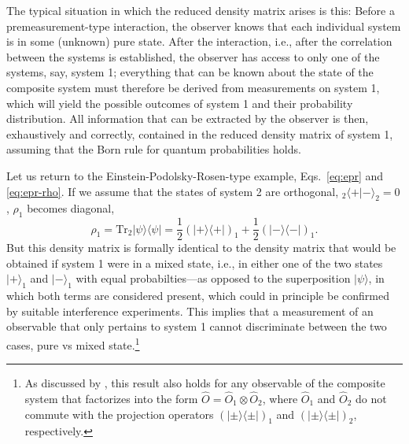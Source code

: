 \documentclass[twocolumn,rmp,aps,amsmath,amsfonts,noshowkeys,noshowpacs]{revtex4}
\newcommand{\ket}[1]{\ensuremath{|{#1\rangle}}}
\newcommand{\bra}[1]{\ensuremath{{\langle #1}|}}
\begin{document}
The typical situation in which the reduced density matrix arises is
this: Before a premeasurement-type interaction, the observer knows
that each individual system is in some (unknown) pure state.  After
the interaction, i.e., after the correlation between the systems is
established, the observer has access to only one of the systems, say,
system 1; everything that can be known about the state of the
composite system must therefore be derived from measurements on system
1, which will yield the possible outcomes of system 1 and their
probability distribution. All information that can be extracted by the
observer is then, exhaustively and correctly, contained in the reduced
density matrix of system 1, assuming that the Born rule for quantum
probabilities holds.

Let us return to the Einstein-Podolsky-Rosen-type example,
Eqs.~\eqref{eq:epr} and \eqref{eq:epr-rho}. If we assume that the
states of system 2 are orthogonal, ${_2\langle +} | - \rangle_2 = 0$,
$\rho_1$ becomes diagonal,
%
\begin{equation}
\rho_1 = \text{Tr}_2 \ket{\psi}\bra{\psi} = \frac{1}{2} (\ket{+}
\bra{+})_1 +  \frac{1}{2}(\ket{-} \bra{-})_1.
\end{equation}
%
But this density matrix is formally identical to the density matrix
that would be obtained if system 1 were in a mixed state, i.e., in
either one of the two states $\ket{+}_1$ and $\ket{-}_1$ with equal
probabilties---as opposed to the superposition $\ket{\psi}$, in which
both terms are considered present, which could in principle be
confirmed by suitable interference experiments.  This implies that a
measurement of an observable that only pertains to system 1 cannot
discriminate between the two cases, pure vs mixed state.\footnote{As
  discussed by \citet[pp.~208--210]{Bub:1997:iq}, this result also
  holds for any observable of the composite system that factorizes
  into the form $\widehat{O}=\widehat{O}_1 \otimes \widehat{O}_2$,
  where $\widehat{O}_1$ and $\widehat{O}_2$ do not commute with the
  projection operators $(\ket{\pm}\bra{\pm})_1$ and
  $(\ket{\pm}\bra{\pm})_2$, respectively.}
\end{document}
